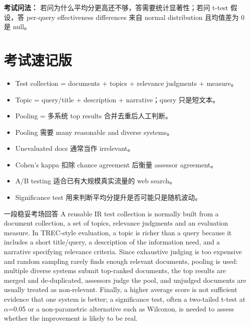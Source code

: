 \documentclass[11pt,a4paper]{ctexart}
\begin{document}
\noindent\textbf{考试问法：} 若问为什么平均分更高还不够，答需要统计显著性；若问 t-test 假设，答 per-query effectiveness differences 来自 normal distribution 且均值差为 0 是 null。

\section{考试速记版}
\begin{itemize}
\item Test collection = documents + topics + relevance judgments + measure。
\item Topic = query/title + description + narrative；query 只是短文本。
\item Pooling = 多系统 top results 合并去重后人工判断。
\item Pooling 需要 many reasonable and diverse systems。
\item Unevaluated docs 通常当作 irrelevant。
\item Cohen's kappa 扣除 chance agreement 后衡量 assessor agreement。
\item A/B testing 适合已有大规模真实流量的 web search。
\item Significance test 用来判断平均分提升是否可能只是随机波动。
\end{itemize}
\begin{callout}{一段稳妥考场回答}
A reusable IR test collection is normally built from a document collection, a set of topics, relevance judgments and an evaluation measure. In TREC-style evaluation, a topic is richer than a query because it includes a short title/query, a description of the information need, and a narrative specifying relevance criteria. Since exhaustive judging is too expensive and random sampling rarely finds enough relevant documents, pooling is used: multiple diverse systems submit top-ranked documents, the top results are merged and de-duplicated, assessors judge the pool, and unjudged documents are usually treated as non-relevant. Finally, a higher average score is not sufficient evidence that one system is better; a significance test, often a two-tailed t-test at \(\alpha\)=0.05 or a non-parametric alternative such as Wilcoxon, is needed to assess whether the improvement is likely to be real.
\end{callout}
\end{document}
